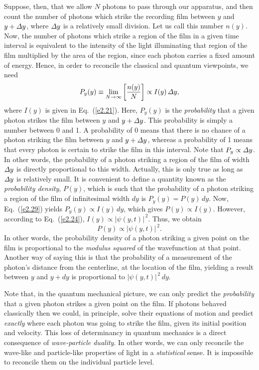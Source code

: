 Suppose, then, that we allow $N$ photons to
pass through our apparatus, and then count the number of photons which
strike the recording film between $y$ and $y+{\mit\Delta}y$, where ${\mit\Delta}y$
is a relatively small division. Let us call this number $n(y)$. Now, the number of
photons which strike a region of the film in a given time interval is equivalent to the intensity of the light illuminating that region of the film multiplied by the area of the region, since
each photon carries a fixed amount of energy. Hence, in order to
reconcile the classical and quantum viewpoints, we need
\begin{equation}\label{e2.29}
P_y(y) \equiv \lim_{N\rightarrow\infty}\left[\frac{n(y)}{N}\right] \propto I(y)\,{\mit\Delta}y,
\end{equation}
where $I(y)$ is given in Eq.~(\ref{e2.21}).
Here, $P_y(y)$ is the {\em probability}\/ that a given photon strikes the film between
$y$ and $y+{\mit\Delta}y$. This probability is simply a number between 0 and 1.
A probability of 0 means that there is no chance of a photon striking the
film between $y$ and $y+{\mit\Delta}y$, whereas a probability of 1
means that every photon is certain to strike the film in this interval. 
Note that $P_y\propto {\mit\Delta}y$. In other words,  the probability of a photon
striking a region of the film of width ${\mit\Delta}y$ is directly proportional
to this width. Actually, this is only true as long as ${\mit\Delta}y$ is
relatively small.  It is convenient to define a quantity known as the {\em probability
density}, $P(y)$, which is such that the probability of a photon striking a region of
the film of infinitesimal width $dy$ is $P_y(y) = P(y)\,dy$. Now,
Eq.~(\ref{e2.29}) yields $P_y(y)\propto I(y)\, dy$, which gives $P(y)\propto I(y)$. However, according to
Eq.~(\ref{e2.24}), $I(y) \propto |\psi(y,t)|^{\,2}$. Thus, we obtain
\begin{equation}
P(y) \propto |\psi(y,t)|^{\,2}.
\end{equation}
In other words, the probability density of a photon striking a given point
on the film is proportional to the {\em modulus squared}\/ of the wavefunction at that point. Another way of saying this is that the probability
of a measurement of the photon's distance from the centerline, at
the location of the film, yielding a result between $y$ and $y+dy$
is proportional to $|\psi(y,t)|^{\,2}\,dy$.

Note that, in the quantum mechanical picture, we can only predict
the {\em probability}\/ that a given photon strikes a given point on the
film. If photons behaved classically then we could, in principle, solve their
equations of motion and predict {\em exactly}\/ where each photon was going to strike
the film, given its initial position and velocity. This loss of determinancy
in quantum mechanics is a direct consequence of {\em wave-particle duality}. 
In other words, we can only reconcile the wave-like and particle-like
properties of light in a {\em statistical}\/ sense. It is impossible to reconcile
them on the individual particle level.

